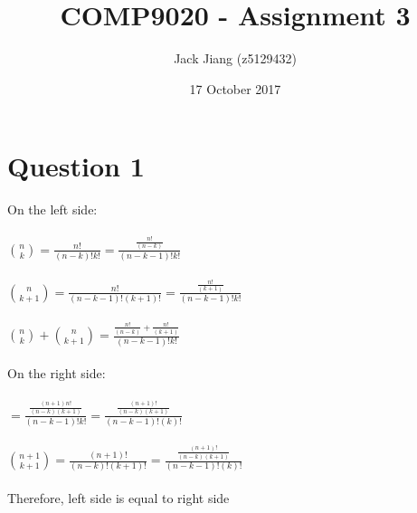\documentclass[11pt, a4paper]{article}
\begin{document}
\title{COMP9020 - Assignment 3}
\author{Jack Jiang (z5129432)}
\date{ 17 October 2017 }
\maketitle
\graphicspath{{Graphics/}}

\section*{Question 1}
    On the left side:\\
    \\
    $ \binom nk = \frac{n!}{(n-k)!k!} = \frac {\frac {n!}{(n-k)}}{(n-k-1)!k!} $\\
    \\
    $ \binom {n}{k+1} = \frac {n!}{(n-k-1)!(k+1)!} = \frac {\frac {n!}{(k+1)}}{(n-k-1)!k!} $\\
    \\
    $ \binom nk + \binom {n}{k+1} = \frac {\frac {n!}{(n-k)} + \frac{n!}{(k+1)} }{(n-k-1)!k!}$\\
    \\
    On the right side:\\
    \\
    $ =  \frac {\frac {(n+1)n!}{(n-k)(k+1)} }{(n-k-1)!k!} = \frac { \frac {(n+1)!}{(n-k)(k+1)} }{(n-k-1)!(k)!} $\\
    \\
    $ \binom {n+1}{k+1} = \frac {(n+1)!}{(n-k)!(k+1)!}  =  \frac { \frac {(n+1)!}{(n-k)(k+1)} }{(n-k-1)!(k)!} $\\
    \\
    Therefore, left side is equal to right side
\end{document}

